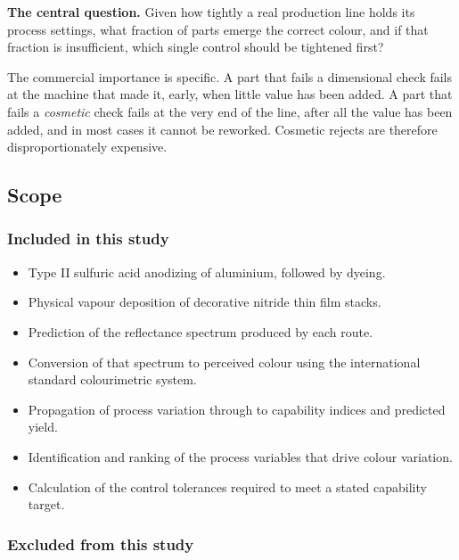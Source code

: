 \documentclass[11pt,a4paper]{article}
\begin{document}
\begin{keypoint}
\textbf{The central question.} Given how tightly a real production line holds
its process settings, what fraction of parts emerge the correct colour, and if
that fraction is insufficient, which single control should be tightened first?
\end{keypoint}

The commercial importance is specific. A part that fails a dimensional check
fails at the machine that made it, early, when little value has been added. A
part that fails a \emph{cosmetic} check fails at the very end of the line,
after all the value has been added, and in most cases it cannot be reworked.
Cosmetic rejects are therefore disproportionately expensive.

\subsection{Scope}

\subsubsection{Included in this study}

\begin{itemize}[leftmargin=1.4em, itemsep=2pt]
\item Type II sulfuric acid anodizing of aluminium, followed by dyeing.
\item Physical vapour deposition of decorative nitride thin film stacks.
\item Prediction of the reflectance spectrum produced by each route.
\item Conversion of that spectrum to perceived colour using the international
standard colourimetric system.
\item Propagation of process variation through to capability indices and
predicted yield.
\item Identification and ranking of the process variables that drive colour
variation.
\item Calculation of the control tolerances required to meet a stated
capability target.
\end{itemize}

\subsubsection{Excluded from this study}
\end{document}
